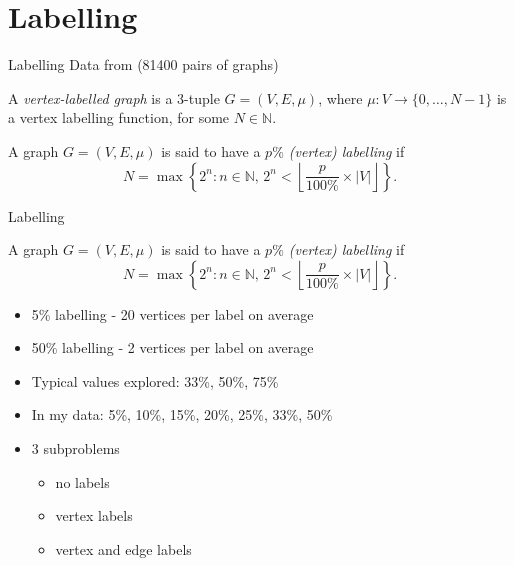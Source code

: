 \documentclass{beamer}
\begin{document}
\section{Labelling}

\begin{frame}{Labelling}
  Data from \cite{foggia2001-2, DBLP:journals/prl/SantoFSV03} (81400 pairs
  of graphs)
  \pause
  \begin{definition}
    A \emph{vertex-labelled graph} is a 3-tuple $G = (V, E, \mu)$, where $\mu
    \colon V \to \{ 0, \dots, N - 1 \}$ is a vertex labelling function, for some
    $N \in \mathbb{N}$.
  \end{definition}
  \pause
  \begin{definition}
    A graph $G = (V, E, \mu)$ is said to have a \emph{$p\%$ (vertex) labelling} if
    \[ N = \max \left\{ 2^n : n \in \mathbb{N},\, 2^n < \left\lfloor \frac{p}{100\%}
          \times |V| \right\rfloor \right\}. \]
  \end{definition}
\end{frame}

\begin{frame}{Labelling}
  \begin{definition}
    A graph $G = (V, E, \mu)$ is said to have a \emph{$p\%$ (vertex) labelling} if
    \[ N = \max \left\{ 2^n : n \in \mathbb{N},\, 2^n < \left\lfloor \frac{p}{100\%}
          \times |V| \right\rfloor \right\}. \]
  \end{definition}
  \begin{itemize}
  \item 5\% labelling - 20 vertices per label on average
  \item 50\% labelling - 2 vertices per label on average
    \pause
  \item Typical values explored: 33\%, 50\%, 75\%
    \pause
  \item In my data: 5\%, 10\%, 15\%, 20\%, 25\%, 33\%, 50\%
    \pause
  \item 3 subproblems
    \begin{itemize}
    \item no labels
    \item vertex labels
    \item vertex and edge labels
    \end{itemize}
  \end{itemize}
\end{frame}
\end{document}
